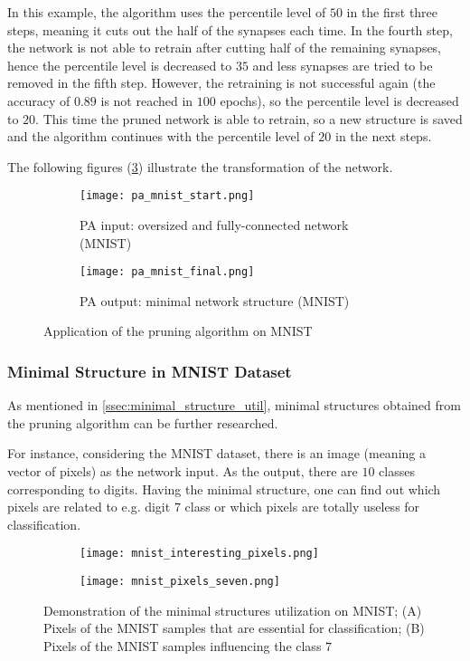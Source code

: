 In this example, the algorithm uses the percentile level of $ 50 $ in the first three steps, meaning it cuts out the half of the synapses each time. In the fourth step, the network is not able to retrain after cutting half of the remaining synapses, hence the percentile level is decreased to $ 35 $ and less synapses are tried to be removed in the fifth step. However, the retraining is not successful again (the accuracy of $ 0.89 $ is not reached in $ 100 $ epochs), so the percentile level is decreased to $ 20 $. This time the pruned network is able to retrain, so a new structure is saved and the algorithm continues with the percentile level of $ 20 $ in the next steps.

The following figures (\ref{img:pa_mnist_morph}) illustrate the transformation of the network.
\begin{figure}[H]
\centering
\begin{subfigure}{0.45\textwidth}
  \centering
  \texttt{[image: pa\_mnist\_start.png]}
  \caption{PA input: oversized and fully-connected network (MNIST)}
  \label{img:pa_mnist_start}
\end{subfigure}%
\begin{subfigure}{0.45\textwidth}
  \centering
  \texttt{[image: pa\_mnist\_final.png]}
  \caption{PA output: minimal network structure (MNIST)}
  \label{img:pa_mnist_final}
\end{subfigure}
\caption{Application of the pruning algorithm on MNIST}
\label{img:pa_mnist_morph}
\end{figure}

\subsubsection{Minimal Structure in MNIST Dataset} \label{sssec:mnist_analysis}
As mentioned in \cref{ssec:minimal_structure_util}, minimal structures obtained from the pruning algorithm can be further researched.

For instance, considering the MNIST dataset, there is an image (meaning a vector of pixels) as the network input. As the output, there are $ 10 $ classes corresponding to digits. Having the minimal structure, one can find out which pixels are related to e.g. digit $ 7 $ class or which pixels are totally useless for classification.

\begin{figure}[H]
\centering
\begin{subfigure}{0.45\textwidth}
  \centering
  \texttt{[image: mnist\_interesting\_pixels.png]}
  \caption{}
  \label{img:msu_interesting}
\end{subfigure}%
\begin{subfigure}{0.45\textwidth}
  \centering
  \texttt{[image: mnist\_pixels\_seven.png]}
  \caption{}
  \label{img:msu_seven}
\end{subfigure}
\caption{Demonstration of the minimal structures utilization on MNIST; (A) Pixels of the MNIST samples that are essential for classification; (B) Pixels of the MNIST samples influencing the class $ 7 $}
\label{img:pa_xor_morph}
\end{figure}

